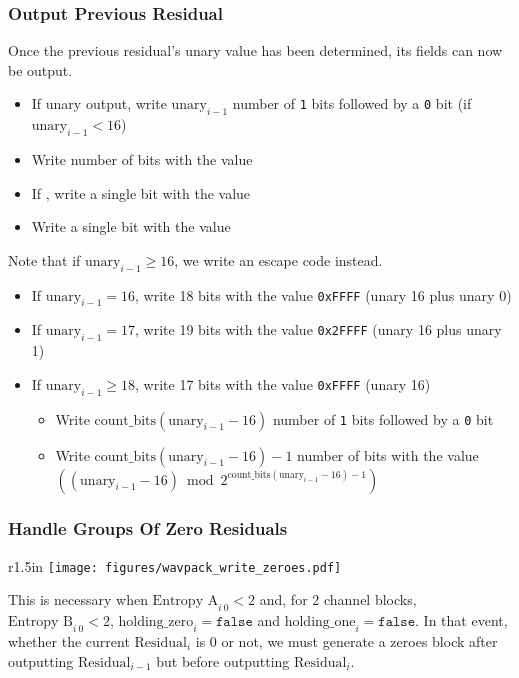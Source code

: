 \subsubsection{Output Previous Residual}

Once the previous residual's unary value has been determined,
its fields can now be output.
\begin{itemize}
\item If unary output, write $\text{unary}_{i - 1}$ number of \texttt{1} bits followed by a \texttt{0} bit (if $\text{unary}_{i - 1} < 16$)
\item Write  number of bits with the value 
\item If , write a single bit with the value 
\item Write a single bit with the value 
\end{itemize}
Note that if $\text{unary}_{i - 1} \geq 16$, we write an escape code instead.
\begin{itemize}
\item If $\text{unary}_{i - 1} = 16$, write 18 bits with the value \texttt{0xFFFF} (unary 16 plus unary 0)
\item If $\text{unary}_{i - 1} = 17$, write 19 bits with the value \texttt{0x2FFFF} (unary 16 plus unary 1)
\item If $\text{unary}_{i - 1} \geq 18$, write 17 bits with the value \texttt{0xFFFF} (unary 16)
\begin{itemize}
\item Write $\text{count\_bits}(\text{unary}_{i - 1} - 16)$ number of
\texttt{1} bits followed by a \texttt{0} bit
\item Write $\text{count\_bits}(\text{unary}_{i - 1} - 16) - 1$ number of bits
with the value
\linebreak
$((\text{unary}_{i - 1} - 16) \bmod{2 ^ {\text{count\_bits}(\text{unary}_{i - 1} - 16) - 1}})$
\end{itemize}
\end{itemize}

\subsubsection{Handle Groups Of Zero Residuals}
\label{wavpack_zero_residuals}
\begin{wrapfigure}[12]{r}{1.5in}
\texttt{[image: figures/wavpack\_write\_zeroes.pdf]}
\end{wrapfigure}
This is necessary when $\text{Entropy A}_{i~0} < 2$ and,
for 2 channel blocks, $\text{Entropy B}_{i~0} < 2$,
$\text{holding\_zero}_i = \texttt{false}$ and
$\text{holding\_one}_i = \texttt{false}$.
In that event, whether the current $\text{Residual}_i$ is 0 or not,
we must generate a zeroes block after outputting $\text{Residual}_{i - 1}$
but before outputting $\text{Residual}_i$.

